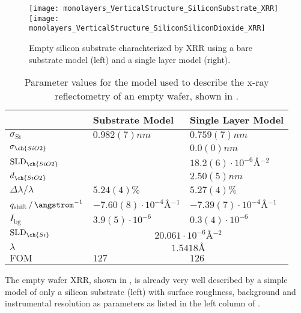\documentclass[\main/dresen_thesis.tex]{subfiles}
\begin{document}
  \begin{figure}[tb]
    \centering
    \texttt{[image: monolayers\_VerticalStructure\_SiliconSubstrate\_XRR]}
    \texttt{[image: monolayers\_VerticalStructure\_SiliconSiliconDioxide\_XRR]}
    \caption{\label{fig:monolayers:structure:emptySiliconWafer}Empty silicon substrate charachterized by XRR using a bare substrate model (left) and a single layer model (right).}
  \end{figure}
  \begin{table}[ht]
    \centering
    \caption{\label{tab:monolayers:structure:emptySiliconWafer}Parameter values for the model used to describe the x-ray reflectometry of an empty wafer, shown in .}
    \begin{tabular}{l | l | l}
      \hline
      &
      Substrate Model &
      Single Layer Model\\
      \hline
      $\sigma_\mathrm{Si}$ &
        $0.982(7)\unit{nm}$ &
        $0.759(7)\unit{nm}$ \\
      $\sigma_{\ch{SiO2}}$ &
        &
        $0.0(0)\unit{nm}$ \\
      $\mathrm{SLD}_{\ch{SiO2}}$ &
        &
        $18.2(6) \cdot \unit{10^{-6} \angstrom^{-2}}$ \\
      $d_{\ch{SiO2}}$ &
        &
        $2.50(5) \unit{nm}$ \\
      \hline
      $\Delta \lambda / \lambda$ &
        $5.24(4) \%$ &
        $5.27(4) \%$ \\
      $q_\mathrm{shift} \,/\, \angstrom^{-1}$ &
        $-7.60(8) \cdot \unit{10^{-4} \angstrom^{-1}}$ &
        $-7.39(7) \cdot \unit{10^{-4} \angstrom^{-1}}$ \\
      $I_\mathrm{bg}$ &
        $3.9(5) \cdot 10^{-6}$ &
        $0.3(4) \cdot 10^{-6}$ \\
      \hline
      $\mathrm{SLD}_{\ch{Si}}$ &
        \multicolumn{2}{c}{$20.061 \cdot \unit{10^{-6} \angstrom^{-2}}$} \\
      $\lambda$ &
        \multicolumn{2}{c}{$1.5418 \unit{\angstrom}$} \\
      \hline
      $\mathrm{FOM}$ &
        $127$ &
        $126$ \\
      \hline
    \end{tabular}
  \end{table}
  The empty wafer XRR, shown in , is already very well described by a simple model of only a silicon substrate (left) with surface roughness, background and instrumental resolution as parameters as listed in the left column of .
\end{document}

